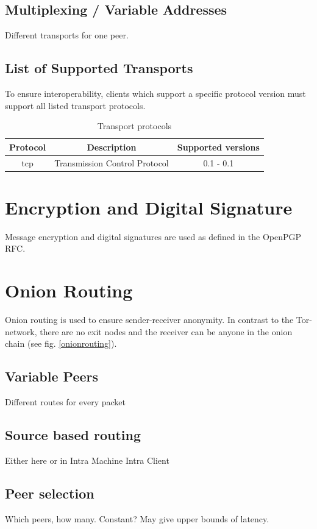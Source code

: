 \subsection{Multiplexing / Variable Addresses}
Different transports for one peer.

\subsection{List of Supported Transports}
To ensure interoperability, clients which support a specific
protocol version must support all listed transport protocols.
\begin{longtable}{|c|c|c|}
\caption{Transport protocols}\\
\hline
\textbf{Protocol} & \textbf{Description} & \textbf{Supported versions}\\
\hline
tcp & Transmission Control Protocol & 0.1 - 0.1\\
\hline
\end{longtable}

\section{Encryption and Digital Signature}
Message encryption and digital signatures are
used as defined in the OpenPGP RFC.\cite{rfc2440}
\section{Onion Routing}
Onion routing is used to ensure sender-receiver anonymity. In contrast
to the Tor-network, there are no exit nodes and the receiver can be anyone
in the onion chain (see fig. \ref{onionrouting}).

\subsection{Variable Peers}
Different routes for every packet

\subsection{Source based routing}
Either here or in Intra Machine Intra Client
\subsection{Peer selection}
Which peers, how many. Constant? May give upper bounds of latency.

